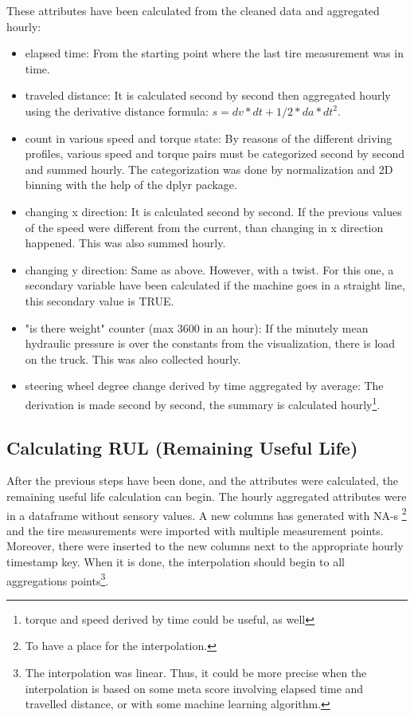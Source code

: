 These attributes have been calculated from the cleaned data and aggregated hourly:
	\begin{itemize}
		\item{elapsed time:} From the starting point where the last tire measurement was in time.
		\item{traveled distance:} It is calculated second by second then aggregated hourly using the derivative distance formula: $s = dv*dt + 1/2*da*dt^2$.
		\item{count in various speed and torque state:} By reasons of the different driving profiles, various speed and torque pairs must be categorized second by second and summed hourly. The categorization was done by normalization and 2D binning with the help of the dplyr package.
		\item{changing x direction:} It is calculated second by second. If the previous values of the speed were different from the current, than changing in x direction happened. This was also summed hourly.
		\item{changing y direction:} Same as above. However, with a twist. For this one, a secondary variable have been calculated if the machine goes in a straight line, this secondary value is TRUE.
		\item{"is there weight" counter (max 3600 in an hour):} If the minutely mean hydraulic pressure is over the constants from the visualization, there is load on the truck. This was also collected hourly.
		\item{steering wheel degree change derived by time aggregated by average:} The derivation is made second by second, the summary is calculated hourly\footnote{torque and speed derived by time could be useful, as well}.
	\end{itemize}
\subsection{Calculating RUL (Remaining Useful Life)}
	After the previous steps have been done, and the attributes were calculated, the remaining useful life calculation can begin.
	The hourly aggregated attributes were in a dataframe without sensory values. A new columns has generated with NA-s \footnote{To have a place for the interpolation.} and the tire measurements were imported with multiple measurement points. Moreover, there were inserted to the new columns next to the appropriate hourly timestamp key. When it is done, the interpolation should begin to all aggregations points\footnote{The interpolation was linear. Thus, it could be more precise when the interpolation is based on some meta score involving elapsed time and travelled distance, or with some machine learning algorithm.}.

